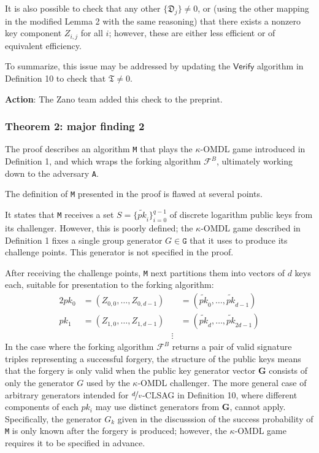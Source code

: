 \documentclass{article}
\begin{document}
It is also possible to check that any other $\{\mathfrak{D}_j\} \neq 0$, or (using the other mapping in the modified Lemma 2 with the same reasoning) that there exists a nonzero key component $Z_{i,j}$ for all $i$; however, these are either less efficient or of equivalent efficiency.

To summarize, this issue may be addressed by updating the $\mathsf{Verify}$ algorithm in Definition 10 to check that $\mathfrak{T} \neq 0$.

\textbf{Action}: The Zano team added this check to the preprint.


\subsubsection{Theorem 2: major finding 2}

The proof describes an algorithm \texttt{M} that plays the $\kappa$-OMDL game introduced in Definition 1, and which wraps the forking algorithm $\mathcal{F}^B$, ultimately working down to the adversary \texttt{A}.

The definition of \texttt{M} presented in the proof is flawed at several points.

It states that \texttt{M} receives a set $S = \{ \widetilde{pk}_i \}_{i=0}^{q-1}$ of discrete logarithm public keys from its challenger.
However, this is poorly defined; the $\kappa$-OMDL game described in Definition 1 fixes a single group generator $G \in \texttt{G}$ that it uses to produce its challenge points.
This generator is not specified in the proof.

After receiving the challenge points, \texttt{M} next partitions them into vectors of $d$ keys each, suitable for presentation to the forking algorithm:
\begin{alignat*}{2}
	pk_0 &= (Z_{0,0}, \ldots, Z_{0,d-1}) &&= (\widetilde{pk}_0, \ldots, \widetilde{pk}_{d-1}) \\
	pk_1 &= (Z_{1,0}, \ldots, Z_{1,d-1}) &&= (\widetilde{pk}_d, \ldots, \widetilde{pk}_{2d-1}) \\
	&&\vdots
\end{alignat*}
In the case where the forking algorithm $\mathcal{F}^B$ returns a pair of valid signature triples representing a successful forgery, the structure of the public keys means that the forgery is only valid when the public key generator vector $\bm{G}$ consists of only the generator $G$ used by the $\kappa$-OMDL challenger.
The more general case of arbitrary generators intended for $\nicefrac{d}{v}$-CLSAG in Definition 10, where different components of each $pk_i$ may use distinct generators from $\bm{G}$, cannot apply.
Specifically, the generator $G_k$ given in the discusssion of the success probability of \texttt{M} is only known after the forgery is produced; however, the $\kappa$-OMDL game requires it to be specified in advance.
\end{document}
